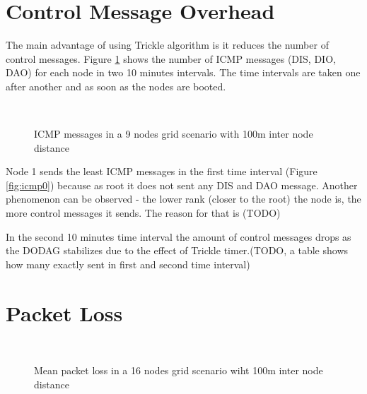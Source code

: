 \section{Control Message Overhead}
\label{ICMP}
The main advantage of using Trickle algorithm is it reduces the number of control messages. Figure \ref{fig:icmp} shows the number of ICMP messages (DIS, DIO, DAO) for each node in two 10 minutes intervals. The time intervals are taken one after another and as soon as the nodes are booted. 
\begin{figure}[htbp]
  \begin{center}
    \leavevmode
    \\
    \caption{ICMP messages in a 9 nodes grid scenario with 100m inter node distance}
    \label{fig:icmp}
  \end{center}
\end{figure}
Node 1 sends the least ICMP messages in the first time interval (Figure \ref{fig:icmp0}) because as root it does not sent any DIS and DAO message. Another phenomenon can be observed - the lower rank (closer to the root) the node is, the more control messages it sends. The reason for that is (TODO)
\newline

In the second 10 minutes time interval the amount of control messages drops as the DODAG stabilizes due to the effect of Trickle timer.(TODO, a table shows how many exactly sent in first and second time interval)

\section{Packet Loss}
\label{PL}
\begin{figure}[htbp]
  \begin{center}
    \leavevmode
    \\
    \caption{Mean packet loss in a 16 nodes grid scenario wiht 100m inter node distance}
    \label{fig:9_line_100_pl}
  \end{center}
\end{figure}

